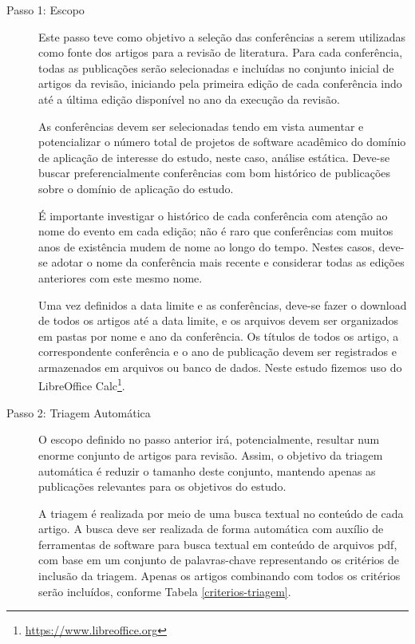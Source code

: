 \begin{description}

  \item [Passo 1: Escopo]

Este passo teve como objetivo a seleção das conferências a serem utilizadas como fonte dos
artigos para a revisão de literatura. 
Para cada conferência, todas as publicações serão selecionadas e
incluídas no conjunto inicial de artigos da revisão, iniciando pela primeira
edição de cada conferência indo até a última edição disponível no ano da execução da revisão.

As conferências devem ser selecionadas tendo em vista aumentar e potencializar
o número total de projetos de software acadêmico do domínio de aplicação de
interesse do estudo, neste caso, análise estática. Deve-se buscar
preferencialmente conferências com bom histórico de publicações sobre o domínio
de aplicação do estudo.

É importante investigar o histórico de cada conferência com atenção ao nome do
evento em cada edição; não é raro que conferências com muitos anos de
existência mudem de nome ao longo do tempo. Nestes casos, deve-se adotar o nome
da conferência mais recente e considerar todas as edições anteriores com este
mesmo nome.

Uma vez definidos a data limite e as conferências, deve-se fazer o download de
todos os artigos até a data limite, e os arquivos devem ser organizados em pastas
por nome e ano da conferência. Os títulos de todos os artigo, a correspondente
conferência e o ano de publicação devem ser registrados e armazenados em
arquivos ou banco de dados. Neste estudo fizemos uso do
LibreOffice Calc\footnote{\url{https://www.libreoffice.org}}.

  \item [Passo 2: Triagem Automática]

O escopo definido no passo anterior irá, potencialmente, resultar num enorme
conjunto de artigos para revisão. Assim, o objetivo da triagem automática é reduzir o tamanho deste
conjunto, mantendo apenas as publicações relevantes para os objetivos do estudo.

A triagem é realizada por meio de uma busca textual no conteúdo de cada artigo. A
busca deve ser realizada de forma automática com auxílio de ferramentas de
software para busca textual em conteúdo de arquivos pdf, com base em um
conjunto de palavras-chave representando os critérios de inclusão da triagem.
Apenas os artigos combinando com todos os critérios serão incluídos, conforme
Tabela \ref{criterios-triagem}.


\end{description}
